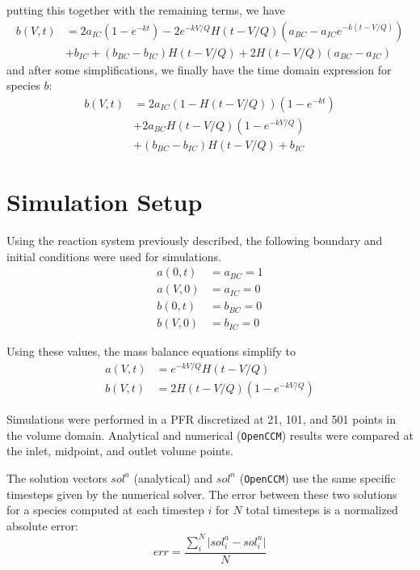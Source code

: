 \documentclass[a4paper,12pt]{article}
\begin{document}
putting this together with the remaining terms, we have 
\begin{align}
	b(V, t) &= 2a_{IC} (1-e^{-kt}) - 2e^{-kV/Q}H(t-V/Q) \left( a_{BC} - a_{IC}e^{-k(t-V/Q)} \right)\\
			&+ b_{IC} + (b_{BC}-b_{IC})H(t-V/Q) + 2H(t-V/Q) (a_{BC}-a_{IC})
\end{align}
and after some simplifications, we finally have the time domain expression for species $b$:
\begin{align}
	b(V, t) &= 2a_{IC} \left(1-H(t-V/Q)\right) \left(1-e^{-kt}\right) \\
				&+ 2 a_{BC} H(t-V/Q) (1-e^{-kV/Q}) \\
				&+ (b_{BC} - b_{IC}) H(t-V/Q) + b_{IC}
\end{align}

\section{Simulation Setup}

Using the reaction system previously described, the following boundary and initial conditions were used for simulations. 
\begin{align}
	a(0, t) &= a_{BC} = 1\\
	a(V, 0) &= a_{IC} = 0\\
	b(0, t) &= b_{BC} = 0\\
	b(V, 0) &= b_{IC} = 0
\end{align}

Using these values, the mass balance equations simplify to 
\begin{align}
	a(V, t) &= e^{-kV/Q}H(t-V/Q)\\
	b(V, t) &= 2 H(t-V/Q) (1-e^{-kV/Q}) 
\end{align}

Simulations were performed in a PFR discretized at 21, 101, and 501 points in the volume domain. 
Analytical and numerical (\texttt{OpenCCM}) results were compared at the inlet, midpoint, and outlet volume points. 

The solution vectors $sol^a$ (analytical) and $sol^n$ (\texttt{OpenCCM}) use the same specific timesteps given by the numerical solver.
The error between these two solutions for a species computed at each timestep $i$ for $N$ total timesteps is a normalized absolute error:
\begin{equation}
	err = \frac{\sum_i^N \lvert sol^a_i - sol^n_i \rvert}{N}
\end{equation}
\end{document}
